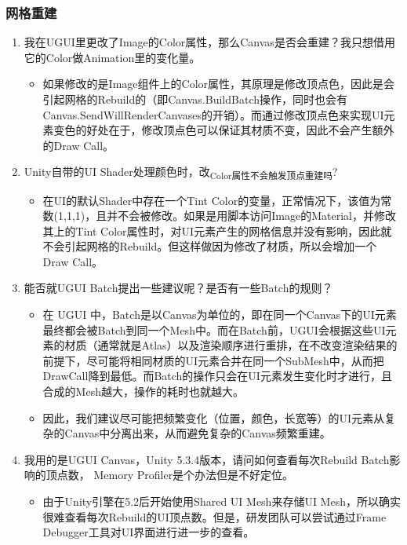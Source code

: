 \documentclass[9pt, b5paper]{article}
\begin{document}
\subsubsection{网格重建}
\label{sec:orgc0567e4}
\begin{enumerate}
\item 我在UGUI里更改了Image的Color属性，那么Canvas是否会重建？我只想借用它的Color做Animation里的变化量。
\label{sec:orga0acb41}
\begin{itemize}
\item 如果修改的是Image组件上的Color属性，其原理是修改顶点色，因此是会引起网格的Rebuild的（即Canvas.BuildBatch操作，同时也会有Canvas.SendWillRenderCanvases的开销）。而通过修改顶点色来实现UI元素变色的好处在于，修改顶点色可以保证其材质不变，因此不会产生额外的Draw Call。
\end{itemize}
\item Unity自带的UI Shader处理颜色时，改\textsubscript{Color属性不会触发顶点重建吗}?
\label{sec:org6ffc6cf}
\begin{itemize}
\item 在UI的默认Shader中存在一个Tint Color的变量，正常情况下，该值为常数(1,1,1)，且并不会被修改。如果是用脚本访问Image的Material，并修改其上的Tint Color属性时，对UI元素产生的网格信息并没有影响，因此就不会引起网格的Rebuild。但这样做因为修改了材质，所以会增加一个Draw Call。
\end{itemize}
\item 能否就UGUI Batch提出一些建议呢？是否有一些Batch的规则？
\label{sec:org62838d4}
\begin{itemize}
\item 在 UGUI 中，Batch是以Canvas为单位的，即在同一个Canvas下的UI元素最终都会被Batch到同一个Mesh中。而在Batch前，UGUI会根据这些UI元素的材质（通常就是Atlas）以及渲染顺序进行重排，在不改变渲染结果的前提下，尽可能将相同材质的UI元素合并在同一个SubMesh中，从而把DrawCall降到最低。而Batch的操作只会在UI元素发生变化时才进行，且合成的Mesh越大，操作的耗时也就越大。
\item 因此，我们建议尽可能把频繁变化（位置，颜色，长宽等）的UI元素从复杂的Canvas中分离出来，从而避免复杂的Canvas频繁重建。
\end{itemize}
\item 我用的是UGUI Canvas，Unity 5.3.4版本，请问如何查看每次Rebuild Batch影响的顶点数， Memory Profiler是个办法但是不好定位。
\label{sec:org245b40d}
\begin{itemize}
\item 由于Unity引擎在5.2后开始使用Shared UI Mesh来存储UI Mesh，所以确实很难查看每次Rebuild的UI顶点数。但是，研发团队可以尝试通过Frame Debugger工具对UI界面进行进一步的查看。

\end{itemize}
\end{enumerate}
\end{document}
